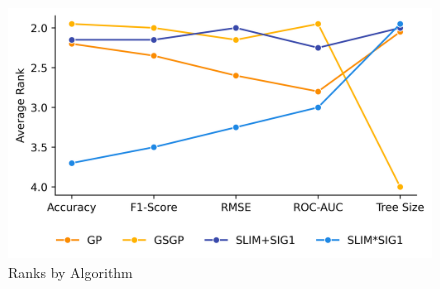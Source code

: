 
    \begin{figure}[h]
    \centering
    \includegraphics[width=\linewidth]{../Latex/Chapters/Figures/Results/comparison_ranks.png}
    \caption{Ranks by Algorithm}
    \label{fig:ranks}
    \end{figure}
    